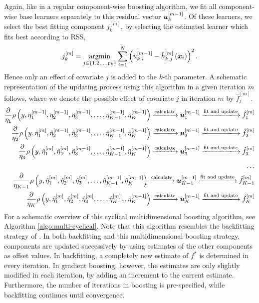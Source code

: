 Again, like in a regular component-wise boosting algorithm, we fit all component-wise base learners separately to this residual vector $\bm{u}_k^{[m-1]}$.
Of these learners, we select the best fitting component $j_k^{[m]}$, by selecting the estimated learner which fits best according to RSS,
\begin{equation*}
    j_k^{[m]}=\operatorname*{argmin}_{j\in\{1,2,\ldots,p_k\}}\sum_{i=1}^N \left(u_{k,i}^{[m-1]}-\hat{h}_{k,j}^{[m]}\left(\bm{x}_i\right)\right)^2.
\end{equation*}
Hence only an effect of covariate $j$ is added to the $k$-th parameter.
A schematic representation of the updating process using this algorithm in a given iteration $m$ follows, where we denote the possible effect of covariate $j$ in iteration $m$ by $\hat{f}_j^{[m]}$.
\begin{align*}
    \frac{\partial}{\eta_1}\rho\left(y,\eta_1^{[m-1]},\eta_2^{[m-1]},\eta_3^{[m-1]},\ldots,\eta_{K-1}^{[m-1]},\eta_K^{[m-1]}\right)
    \xlongrightarrow{\text{calculate}}\u_{1}^{[m-1]}
    \xlongrightarrow{\text{fit and update}}\hat{f}_{1}^{[m]} \\
    \frac{\partial}{\eta_2}\rho\left(y,\hat{\eta}_1^{[m]},\hat{\eta}_2^{[m-1]},\hat{\eta}_3^{[m-1]},\ldots,\hat{\eta}_{K-1}^{[m-1]},\hat{\eta}_K^{[m-1]}\right)
    \xlongrightarrow{\text{calculate}} \u_{2}^{[m-1]}
    \xlongrightarrow{\text{fit and update}}\hat{f}_{2}^{[m]} \\
    \frac{\partial}{\eta_3}\rho\left(y,\hat{\eta}_1^{[m]},\hat{\eta}_2^{[m]},\hat{\eta}_3^{[m-1]},\ldots,\hat{\eta}_{K-1}^{[m-1]},\hat{\eta}_K^{[m-1]}\right)
    \xlongrightarrow{\text{calculate}}\u_{3}^{[m-1]}
    \xlongrightarrow{\text{fit and update}}\hat{f}_{3}^{[m]} \\
    \ldots\\
    \frac{\partial}{\eta_{K-1}}\rho\left(y,\hat{\eta}_1^{[m]},\hat{\eta}_2^{[m]},\hat{\eta}_3^{[m]},\ldots,\hat{\eta}_{K-1}^{[m-1]},\hat{\eta}_K^{[m-1]}\right)
    \xlongrightarrow{\text{calculate}}\u_{K-1}^{[m-1]}
    \xlongrightarrow{\text{fit and update}}\hat{f}_{K-1}^{[m]} \\
    \frac{\partial}{\eta_K}\rho\left(y,\hat{\eta}_1^{[m]},\hat{\eta}_2^{[m]},\hat{\eta}_3^{[m]},\ldots,\hat{\eta}_{K-1}^{[m]},\hat{\eta}_K^{[m-1]}\right)
    \xlongrightarrow{\text{calculate}}\u_{K}^{[m-1]}
    \xlongrightarrow{\text{fit and update}}\hat{f}_{K}^{[m]}
\end{align*}
For a schematic overview of this cyclical multidimensional boosting algorithm, see Algorithm \ref{algo:multi-cyclical}.
Note that this algorithm resembles the backfitting strategy of \citet{hastie1986}.
In both backfitting and this multidimensional boosting strategy, components are updated successively by using estimates of the other components as offset values.
In backfitting, a completely new estimate of $f^*$ is determined in every iteration.
In gradient boosting, however, the estimates are only slightly modified in each iteration, by adding an increment to the current estimate. Furthermore, the number of iterations in boosting is pre-specified, while backfitting continues until convergence.

